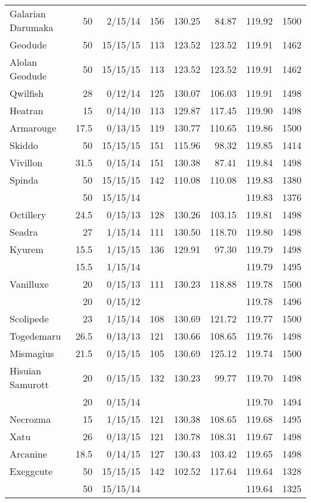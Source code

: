\begin{longtable}{lrrrrrrr}
Galarian Darumaka & 50 & 2/15/14 & 156 & 130.25 & 84.87 & 119.92 & 1500\\
Geodude & 50 & 15/15/15 & 113 & 123.52 & 123.52 & 119.91 & 1462\\
Alolan Geodude & 50 & 15/15/15 & 113 & 123.52 & 123.52 & 119.91 & 1462\\
Qwilfish & 28 & 0/12/14 & 125 & 130.07 & 106.03 & 119.91 & 1498\\
Heatran & 15 & 0/14/10 & 113 & 129.87 & 117.45 & 119.90 & 1498\\
Armarouge & 17.5 & 0/13/15 & 119 & 130.77 & 110.65 & 119.86 & 1500\\
Skiddo & 50 & 15/15/15 & 151 & 115.96 & 98.32 & 119.85 & 1414\\
Vivillon & 31.5 & 0/15/14 & 151 & 130.38 & 87.41 & 119.84 & 1498\\
Spinda & 50 & 15/15/15 & 142 & 110.08 & 110.08 & 119.83 & 1380\\
 & 50 & 15/15/14 & & & & 119.83 & 1376\\
Octillery & 24.5 & 0/15/13 & 128 & 130.26 & 103.15 & 119.81 & 1498\\
Seadra & 27 & 1/15/14 & 111 & 130.50 & 118.70 & 119.80 & 1498\\
Kyurem & 15.5 & 1/15/15 & 136 & 129.91 & 97.30 & 119.79 & 1498\\
 & 15.5 & 1/15/14 & & & & 119.79 & 1495\\
Vanilluxe & 20 & 0/15/13 & 111 & 130.23 & 118.88 & 119.78 & 1500\\
 & 20 & 0/15/12 & & & & 119.78 & 1496\\
Scolipede & 23 & 1/15/14 & 108 & 130.69 & 121.72 & 119.77 & 1500\\
Togedemaru & 26.5 & 0/13/13 & 121 & 130.66 & 108.65 & 119.76 & 1498\\
Mismagius & 21.5 & 0/15/15 & 105 & 130.69 & 125.12 & 119.74 & 1500\\
Hisuian Samurott & 20 & 0/15/15 & 132 & 130.23 & 99.77 & 119.70 & 1498\\
 & 20 & 0/15/14 & & & & 119.70 & 1494\\
Necrozma & 15 & 1/15/15 & 121 & 130.38 & 108.65 & 119.68 & 1495\\
Xatu & 26 & 0/13/15 & 121 & 130.78 & 108.31 & 119.67 & 1498\\
Arcanine & 18.5 & 0/14/15 & 127 & 130.43 & 103.42 & 119.65 & 1498\\
Exeggcute & 50 & 15/15/15 & 142 & 102.52 & 117.64 & 119.64 & 1328\\
 & 50 & 15/15/14 & & & & 119.64 & 1325\\

\end{longtable}
